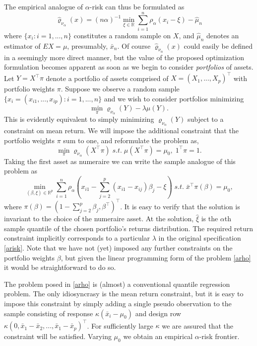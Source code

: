 \documentclass{birkart}
\theoremstyle{definition}
\theoremstyle{remark}
\numberwithin{equation}{section}
\def\RR{\mathbb{R}}
\begin{document}
The empirical analogue of $\alpha$-risk can thus be formulated as
\[
\hat \varrho_{\nu_\alpha} (x) = (n \alpha)^{-1} \min_{\xi \in \RR}
\sum_{i=1}^n \rho_\alpha (x_i - \xi) -  \hat \mu_n
\]
where $\{ x_i : i=1,... , n\}$ constitutes a random sample on $X$, and
$\hat \mu_n$ denotes an estimator of $EX=\mu$, presumably, $\bar x_n$.
Of course $\hat \varrho_{\nu_\alpha} (x)$ 
could easily be defined in a seemingly more direct manner, but the value of the
proposed optimization formulation becomes apparent as soon as 
we begin to consider {\it portfolios} of assets.  Let $Y=X^\top \pi$
denote a portfolio of assets comprised of $X=(X_1 , ... , X_p)^\top$
with portfolio weights $\pi$.  Suppose we observe a random sample
$\{x_i = (x_{i1}, ... , x_{ip}): i = 1, ... , n \}$ and we wish to consider
portfolios minimizing
\begin{equation}\label{arisk}
\min_\pi \varrho_{\nu_\alpha} (Y) - \lambda \mu (Y).
\end{equation}
This is evidently equivalent to simply minimizing 
$ \varrho_{\nu_\alpha} (Y) $ subject to a constraint on mean return.
We will impose the additional constraint that the portfolio weights $\pi$
sum to one, and reformulate the problem as,
\[
\min_\pi \varrho_{\nu_\alpha} (X^\top \pi) \; s.t. \; \mu (X^\top \pi) = \mu_0,
\; 1^\top \pi =1.
\]
Taking the first asset as numeraire we can write the sample analogue of
this problem as 
\begin{equation}\label{arho}
\min_{(\beta,\xi) \in \RR^p } \sum_{i=1}^n 
\rho_{\alpha} (x_{i1} - \sum_{j=2}^p (x_{i1}-x_{ij})\beta_j -\xi)
\; s.t. \; \bar x^\top \pi (\beta) =\mu_0,
\end{equation}
where $\pi(\beta) = (1-\sum_{j=2}^p \beta_j , \beta^\top )^\top$.
It is easy to verify that the solution is invariant to the choice of
the numeraire asset.  At the solution, $\hat \xi$ is the
$\alpha$th sample quantile of the chosen portfolio's returns distribution.
The required return constraint implicitly corresponds to a particular $\lambda$
in the original specification \eqref{arisk}.  Note that we have not (yet)
imposed any further constraints on the portfolio weights $\beta$, but
given the linear programming form of the problem \eqref{arho} it would
be straightforward to do so.

The problem posed in \eqref{arho} is (almost) a conventional quantile
regression problem.  The only idiosyncrasy is the mean return constraint,
but it is easy to impose this constraint by simply adding a single pseudo
observation to the sample consisting of response $\kappa (\bar x_i - \mu_0)$
and design row 
$\kappa ( 0, \bar x_1 - \bar x_2, ... , \bar x_1 - \bar x_p )^\top$.
For sufficiently large $\kappa$ we are assured that the constraint will be
satisfied.  Varying $\mu_0$ we obtain an empirical $\alpha$-risk frontier.
\end{document}
